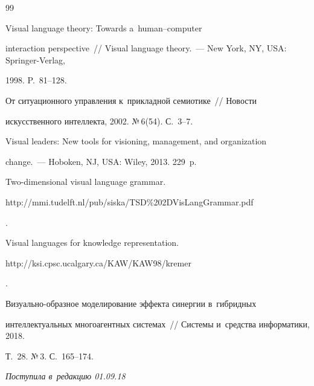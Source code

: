 {{\begin{thebibliography}{99}


   Visual language theory: Towards a~human--computer 


interaction perspective~/\!\!/ Visual language theory.~--- New York, NY, USA: Springer-Verlag, 


1998. P.~81--128.




   От ситуационного управ\-ле\-ния к~прикладной семиотике~/\!\!/ Новости 


искусственного интеллекта, 2002. №\,6(54). С.~3--7. 




   Visual leaders: New tools for visioning, management, and organization  


change.~--- Hoboken, NJ, USA: Wiley, 2013. 229~p.






  Two-dimensional visual language grammar. {\sf 


http://mmi.tudelft.nl/pub/siska/TSD\%202DVisLangGrammar.pdf}. 




   Visual languages for knowledge representation. {\sf 


http://ksi.cpsc.ucalgary.\linebreak ca/KAW/KAW98/kremer}.






Ви\-зу\-аль\-но-об\-раз\-ное моделирование эффекта синергии в~гиб\-рид\-ных 


интеллектуальных многоагентных сис\-те\-мах~/\!\!/ Сис\-те\-мы и~средства информатики, 2018. 


Т.~28. №\,3. С.~165--174.


        \end{thebibliography}


} }








\vspace*{-3pt}





\hfill{\small\textit{Поступила в~редакцию 01.09.18}}














